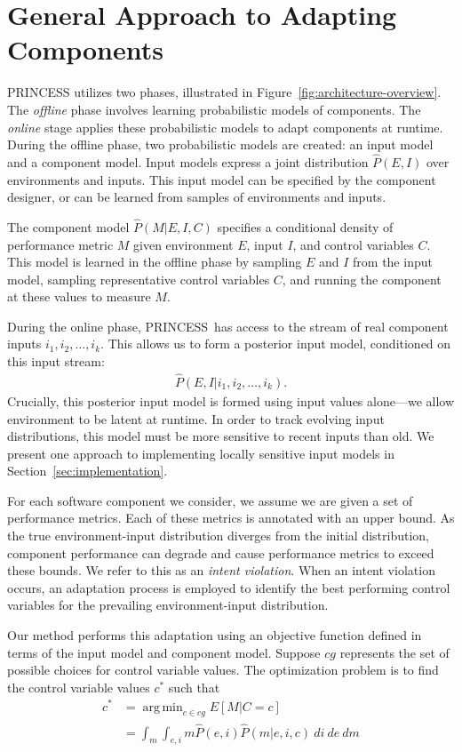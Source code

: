 \documentclass[letterpaper]{article}
\DeclareMathOperator*{\argmin}{arg\,min}
\newcommand{\mname}{PRINCESS~}
\begin{document}
\section{General Approach to Adapting Components}
\label{sec:general-approach}

PRINCESS utilizes two phases, illustrated in Figure~\ref{fig:architecture-overview}.
The \emph{offline} phase involves learning probabilistic models of components.
The \emph{online} stage applies these probabilistic models to adapt components at runtime.
During the offline phase, two probabilistic models are created: an input model and a component model.
Input models express a joint distribution $\hat{P}(E, I)$ over environments and inputs.
This input model can be specified by the component designer, or can be learned from samples of environments and inputs.

The component model $\hat{P}(M|E, I, C)$ specifies a conditional density of performance metric $M$ given environment $E$, input $I$, and control variables $C$.
This model is learned in the offline phase by sampling $E$ and $I$ from the input model, sampling representative control variables $C$, and running the component at these values to measure $M$.

During the online phase, \mname has access to the stream of real component inputs $i_1, i_2, \ldots, i_k$.
This allows us to form a posterior input model, conditioned on this input stream:
\begin{align}
\hat{P}(E, I | i_1, i_2, \ldots, i_k).
\end{align}
Crucially, this posterior input model is formed using input values alone---we allow environment to be latent at runtime.
In order to track evolving input distributions, this model must be more sensitive to recent inputs than old.
We present one approach to implementing locally sensitive input models in Section~\ref{sec:implementation}. 

For each software component we consider, we assume we are given a set of performance metrics.
Each of these metrics is annotated with an upper bound.
As the true environment-input distribution diverges from the initial distribution, component performance can degrade and cause performance metrics to exceed these bounds.
We refer to this as an \emph{intent violation}.
When an intent violation occurs, an adaptation process is employed to identify the best performing control variables for the prevailing environment-input distribution.

Our method performs this adaptation using an objective function defined in terms of the input model and component model.
Suppose $cg$ represents the set of possible choices for control variable values.
The optimization problem is to find the control variable values $c^*$ such that 
\begin{align}
	c^* &= \argmin_{c \in cg} E[M|C=c] \\
		&= \int_m \int_{e, i} m \hat{P}(e, i) \hat{P}(m | e, i, c)~di~de~dm
	\label{eq:marginal-map}
\end{align}
\end{document}
